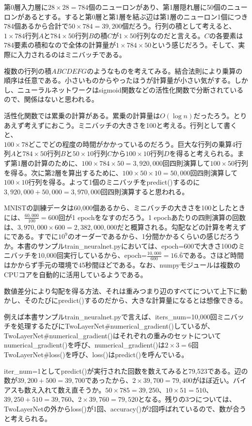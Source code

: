 \documentclass[uplatex,dvipdfmx]{jsarticle} \usepackage{amsmath,amssymb,bm}
\begin{document}
第0層入力層に$28\times28=784$個のニューロンがあり、第1層隠れ層に50個のニューロンがあるとする。すると第0層と第1層を結ぶ辺は第1層のニューロン1個につき784個あるから合計で$50\times 784=39,200$個だろう。行列の積として考えると、$1\times784$行列$A$と$784\times 50$行列$B$の積$C$が$1\times 50$行列なのだと言える。$C$の各要素は784要素の積和なので全体の計算量が$1\times 784\times 50$という感じだろう。そして、実際に入力されるのはミニバッチである。

複数の行列の積$ABCDEFG$のようなものを考えてみる。結合法則により乗算の順序は任意である。小さいものからやったほうが計算量が小さい気がする。しかし、ニューラルネットワークはsigmoid関数などの活性化関数で分断されているので、関係はないと思われる。

活性化関数では累乗の計算がある。累乗の計算量は$O(\log n)$だったろう。とりあえず考えずにおこう。ミニバッチの大きさを100と考える。行列として書くと、$100\times78
どこでどの程度の時間がかかっているのだろう。巨大な行列の乗算4$行列$A$と$784\times50$行列$B$と$50\times10$行列$C$から$100\times10$行列$D$を得ると考えられる。まず第1層の計算のために、$100\times784\times50=3,920,000$回四則演算して$100\times50$行列を得る。次に第2層を算出するために、$100\times50\times10=50,000$回四則演算して$100\times10$行列を得る。よって1個のミニバッチをpredict()するのに$3,920,000+50,000=3,970,000$回四則演算すると思われる。

MNISTの訓練データは60,000個あるから、ミニバッチの大きさを100としたときには、$\frac{60,000}{100}=600$回が1 epochをなすのだろう。1 epochあたりの四則演算の回数は、$3,970,000\times600=2,382,000,000$だと概算される。勾配などの計算を考えずにである。すでに$10^9$のオーダーであるから、1分間かかるくらいの感じだろうか。本書のサンプルtrain\_neuralnet.pyにおいては、epoch=600で大きさ100のミニバッチを10,000回実行しているから、epoch=$\frac{10,000}{600}=16.\bar{6}$である。さほど時間はかからず手元の環境で45秒間ほどである。なお、numpyモジュールは複数のCPUコアを自動的に活用しているようである。

数値差分により勾配を得る方法、それは重みつまり辺のすべてについて上下に動かし、そのたびにpredict()するのだから、大きな計算量になるとは想像できる。

例えば本書サンプルtrain\_neuralnet.pyで言えば、iters\_num=10,000回ミニバッチを処理するたびにTwoLayerNet\#numerical\_gradient()しているが、TwoLayerNet\#numerical\_gradient()はそれぞれの重みのセットについてnumerical\_gradient()を呼び、numerical\_gradient()は$2\times3=6$回TwoLayerNet\#loss()を呼び、loss()はpredict()を呼んでいる。

iter\_num=1としてpredict()が実行された回数を数えてみると79,523である。辺の数が$39,200+500=39,700$であったから、$2\times39,700=79,400$がほぼ近い。バイアスも数え入れて数え直そうか。$50\times785=39,250$、$10\times51=510$、$39,250+510=39,760$、$2\times39,760=79,520$となる。残りの3つについては、TwoLayerNetの外からloss()が1回、accuracy()が2回呼ばれているので、数が合うと考えられる。
\end{document}
